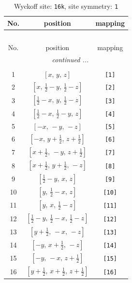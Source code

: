 \documentclass[fleqn,8pt]{jsarticle}
\begin{document}
\begin{longtable}{ccc}
\caption{Wyckoff site: {\tt 16k}, site symmetry: {\tt 1}}
 \\
 \hline \hline
No. & position & mapping \\ \hline \endfirsthead

\multicolumn{2}{l}{\tablename\ \thetable{}} \\
 \hline \hline
No. & position & mapping \\ \hline \endhead

 \hline \hline
\multicolumn{2}{r}{\footnotesize\it continued ...} \\ \endfoot

 \hline \hline
\multicolumn{2}{r}{} \\ \endlastfoot

1 & $\left[ x,\, y,\, z \right]$ & {\tt [1]} \\ \hline
2 & $\left[ x,\, \frac{1}{2} - y,\, \frac{1}{2} - z \right]$ & {\tt [2]} \\ \hline
3 & $\left[ \frac{1}{2} - x,\, y,\, \frac{1}{2} - z \right]$ & {\tt [3]} \\ \hline
4 & $\left[ \frac{1}{2} - x,\, \frac{1}{2} - y,\, z \right]$ & {\tt [4]} \\ \hline
5 & $\left[ - x,\, - y,\, - z \right]$ & {\tt [5]} \\ \hline
6 & $\left[ - x,\, y + \frac{1}{2},\, z + \frac{1}{2} \right]$ & {\tt [6]} \\ \hline
7 & $\left[ x + \frac{1}{2},\, - y,\, z + \frac{1}{2} \right]$ & {\tt [7]} \\ \hline
8 & $\left[ x + \frac{1}{2},\, y + \frac{1}{2},\, - z \right]$ & {\tt [8]} \\ \hline
9 & $\left[ \frac{1}{2} - y,\, x,\, z \right]$ & {\tt [9]} \\ \hline
10 & $\left[ y,\, \frac{1}{2} - x,\, z \right]$ & {\tt [10]} \\ \hline
11 & $\left[ y,\, x,\, \frac{1}{2} - z \right]$ & {\tt [11]} \\ \hline
12 & $\left[ \frac{1}{2} - y,\, \frac{1}{2} - x,\, \frac{1}{2} - z \right]$ & {\tt [12]} \\ \hline
13 & $\left[ y + \frac{1}{2},\, - x,\, - z \right]$ & {\tt [13]} \\ \hline
14 & $\left[ - y,\, x + \frac{1}{2},\, - z \right]$ & {\tt [14]} \\ \hline
15 & $\left[ - y,\, - x,\, z + \frac{1}{2} \right]$ & {\tt [15]} \\ \hline
16 & $\left[ y + \frac{1}{2},\, x + \frac{1}{2},\, z + \frac{1}{2} \right]$ & {\tt [16]} \\
\end{longtable}
\end{document}
